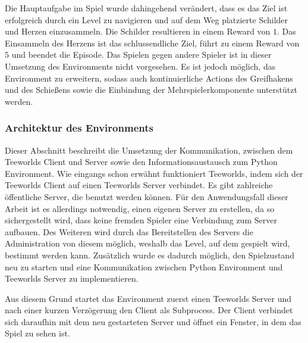\documentclass[11pt]{scrartcl}
\begin{document}
Die Hauptaufgabe im Spiel wurde dahingehend verändert, dass es das Ziel ist erfolgreich
durch ein Level zu navigieren und auf dem Weg platzierte Schilder und Herzen einzusammeln.
Die Schilder resultieren in einem Reward von $1$. Das Einsammeln des Herzens ist das
schlussendliche Ziel, führt zu einem Reward von $5$ und beendet die Episode. Das Spielen
gegen andere Spieler ist in dieser Umsetzung des Environments nicht vorgesehen. 
Es ist jedoch möglich, das Environment zu erweitern, sodass auch kontinuierliche Actions
des Greifhakens und des Schießens sowie die Einbindung der Mehrspielerkomponente
unterstützt werden.

\subsubsection{Architektur des Environments}
\label{sec:architecture-env}
Dieser Abschnitt beschreibt die Umsetzung der Kommunikation, zwischen dem Teeworlds Client
und Server sowie den Informationsaustausch zum Python Environment. Wie eingangs schon
erwähnt funktioniert Teeworlds, indem sich der Teeworlds Client auf einen Teeworlds Server
verbindet. Es gibt zahlreiche öffentliche Server, die benutzt werden können. Für den
Anwendungsfall dieser Arbeit ist es allerdings notwendig, einen eigenen Server zu erstellen,
da so sichergestellt wird, dass keine fremden Spieler eine Verbindung zum Server aufbauen.
Des Weiteren wird durch das Bereitstellen des Servers die Administration von diesem möglich,
weshalb das Level, auf dem gespielt wird, bestimmt werden kann. Zusätzlich wurde
es dadurch möglich, den Spielzustand neu zu starten und eine Kommunikation zwischen Python
Environment und Teeworlds Server zu implementieren.

Aus diesem Grund startet das Environment zuerst einen Teeworlds Server und nach einer
kurzen Verzögerung den Client als Subprocess. Der Client verbindet sich daraufhin mit dem
neu gestarteten Server und öffnet ein Fenster, in dem das Spiel zu sehen ist.
\end{document}
